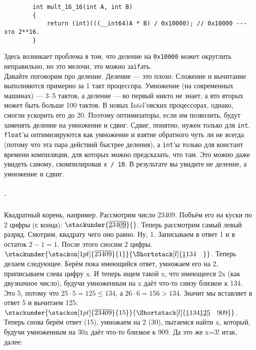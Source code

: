 \documentclass{article}
\begin{document}
    \begin{verbatim}
        int mult_16_16(int A, int B)
        {
            return (int)(((__int64)A * B) / 0x10000); // 0x10000 --- это 2**16.
        }
    \end{verbatim}
    Здесь возникает проблема в том, что деление на \texttt{0x10000} может округлить неправильно, но это мелочи, это можно за\texttt{if}ать.\\
    Давайте поговорим про деление. Деление --- это плохо. Сложение и вычитание выполняются примерно за 1 такт процессора. Умножение (на современных машинах) --- 3--5 тактов, а деление --- во первый никто не знает, а вто вторых может быть больше 100 тактов. В новых Intel'овских процессорах, однако, смогли ускорить его до 20. Поэтому оптимизаторы, если им позволить, будут заменять деление на умножение и сдвиг. Сдвиг, понятно, нужен только для \texttt{int}. \texttt{float}'ы оптимизируются как умножение и взятие обратного чуть ли не всегда (потому что эта пара действий быстрее деления), а \texttt{int}'ы только для констант времени компиляции, для которых можно предсказать, что там. Это можно даже увидеть самому, скомпилировав \texttt{x / 10}. В результате вы увидите не деление, а умножение и сдвиг.\\
    \subparagraph{.}
    Квадратный корень, например. Рассмотрим число 23409. Побъём его на куски по 2 цифры (с конца): 
    \stackMath\def\stackalignment{r}
    \(
    \stackunder{
        \overline{\underline234\underline{09}}
    }{}
    \). Теперь рассмотрим самый левый разряд. Смотрим, квадрату чего оно равно. Ну, 1. Записываем в ответ 1 и в остаток $2-1=1$. После этого сносим 2 цифры.
    \let\ph\phantom
    \stackMath\def\stackalignment{r}
    \(
    \stackunder{
        \stackon[1pt]{\overline{23409}}{1}
    }{
        \Shortstack[l]{{\underline{1}} 134\ph{00}}
    }
    \). Теперь делаем следующее. Берём пока имеющийся ответ, умножаем его на 2, приписываем слева цифру x. И теперь ищем такой x, что имеющееся 2x (как двузначное число), будучи умноженным на x даёт что-то снизу близкое к 134. Это 5, потому что $25\cdot5=125\leqslant134$, а $26\cdot6=156>134$. Значит мы вставляет в ответ 5 и вычитаем 125:
    \stackMath\def\stackalignment{r}
    \(
    \stackunder{
        \stackon[1pt]{\overline{23409}}{15}
    }{
        \Shortstack[l]{{\underline{1}} 134 {\underline{125}} \ph{00}909}
    }
    \). Теперь снова берём ответ (15), умножаем на 2 (30), пытаемся найти x, который, будучи умноженным на 30x даёт что-то близкое к 909. Да это же x=3! итак, далее:
\end{document}
